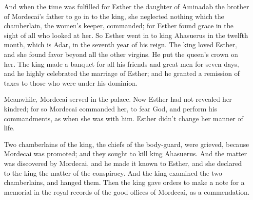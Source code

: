 {And when the time was fulfilled for Esther the daughter of Aminadab the brother of Mordecai’s father to go in to the king, she neglected nothing which the chamberlain, the women’s keeper, commanded; for Esther found grace in the sight of all who looked at her.
So Esther went in to king Ahasuerus in the twelfth month, which is Adar, in the seventh year of his reign.
The king loved Esther, and she found favor beyond all the other virgins. He put the queen’s crown on her.
The king made a banquet for all his friends and great men for seven days, and he highly celebrated the marriage of Esther; and he granted a remission of taxes to those who were under his dominion.
\par }{\PP {}Meanwhile, Mordecai served in the palace.
Now Esther had not revealed her
 kindred; for so Mordecai commanded her, to fear God, and perform his commandments, as when she was with him. Esther didn’t change her manner of life.
\par }{\PP {}Two chamberlains of the king, the chiefs of the body-guard, were grieved, because Mordecai was promoted; and they sought to kill king Ahasuerus.
And the matter was discovered by Mordecai, and he made it known to Esther, and she declared to the king the matter of the conspiracy.
And the king examined the two chamberlains, and hanged them. Then the king gave orders to make a note for a memorial in the royal
 records of the good offices of Mordecai, as a commendation.

}
